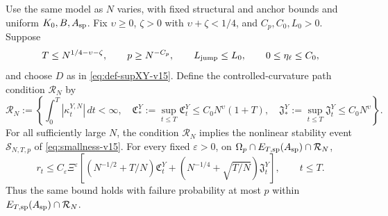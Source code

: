 \begin{corollary}
\label{cor:fixed-schedule-high-prob-r-rate-v15}
Use the same model as $N$ varies, with fixed structural and anchor bounds and
uniform $K_0,B,A_{\rm sp}$. Fix $\upsilon\ge0$, $\zeta>0$ with $\upsilon+\zeta<1/4$, and $C_p,C_0,L_0>0$.
Suppose
\[
T\le N^{1/4-\upsilon-\zeta},\qquad p\ge N^{-C_p},\qquad
L_{\mathrm{jump}}\le L_0,\qquad 0\le\eta_\ell\le C_0,
\]
and choose $D$ as in \eqref{eq:def-supXY-v15}.
Define the controlled-curvature path condition $\mathcal R_N$ by
\begin{equation}
\label{eq:reference-response-event}
\mathcal R_N:=\left\{\int_0^T|\kappa_t^{Y,N}|\,dt<\infty,\quad
\mathfrak C_*^Y:=\sup_{t\le T}\mathfrak C_t^Y
\le C_0N^\upsilon(1+T),\quad
\mathfrak J_*^Y:=\sup_{t\le T}\mathfrak J_t^Y\le C_0N^\upsilon\right\}.
\end{equation}
For all sufficiently large $N$, the condition $\mathcal R_N$ implies the
nonlinear stability event $\mathcal S_{N,T,p}$ of \eqref{eq:smallness-v15}.
For every fixed $\varepsilon>0$, on
$\Omega_p\cap E_{T,\rm sp}(A_{\rm sp})\cap\mathcal R_N$,
\begin{equation}
\label{eq:r-rate-simplified-v15}
r_t\le C_\varepsilon\Xi^\varepsilon
\left[(N^{-1/2}+T/N)\mathfrak C_t^Y
+(N^{-1/4}+\sqrt{T/N})\mathfrak J_t^Y\right],\qquad t\le T.
\end{equation}
Thus the same bound holds with failure probability at most $p$ within
$E_{T,\rm sp}(A_{\rm sp})\cap\mathcal R_N$.
\end{corollary}
